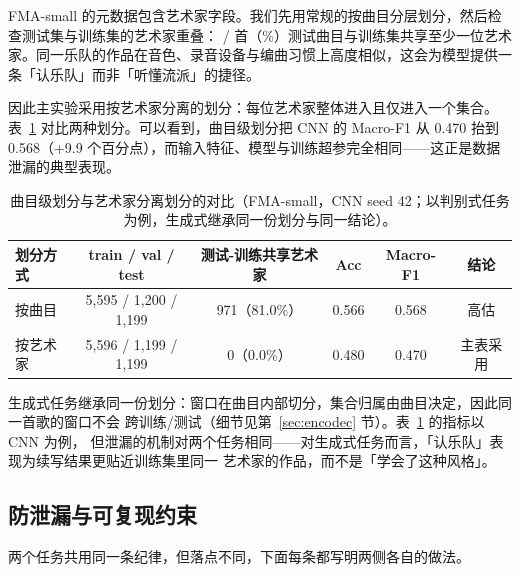 \documentclass[UTF8,10pt,a4paper]{ctexart}
\begin{document}
FMA-small 的元数据包含艺术家字段。我们先用常规的按曲目分层划分，然后检查测试集与训练集的艺术家重叠：\FmaTrackLeak{} / \FmaTrackLeakN{} 首（\FmaTrackLeakPct\%）测试曲目与训练集共享至少一位艺术家。同一乐队的作品在音色、录音设备与编曲习惯上高度相似，这会为模型提供一条「认乐队」而非「听懂流派」的捷径。

因此主实验采用按艺术家分离的划分：每位艺术家整体进入且仅进入一个集合。表~\ref{tab:leak} 对比两种划分。可以看到，曲目级划分把 CNN 的 Macro-F1 从 0.470 抬到 0.568（+9.9 个百分点），而输入特征、模型与训练超参完全相同——这正是数据泄漏的典型表现。

\begin{table}[H]
\centering\small
\caption{曲目级划分与艺术家分离划分的对比（FMA-small，CNN seed 42；以判别式任务为例，生成式继承同一份划分与同一结论）。}
\label{tab:leak}
\begin{tabular}{lccccc}
\toprule
划分方式 & train / val / test & 测试-训练共享艺术家 & Acc & Macro-F1 & 结论\\
\midrule
按曲目 & 5,595 / 1,200 / 1,199 & 971（81.0\%） & 0.566 & 0.568 & 高估\\
按艺术家 & 5,596 / 1,199 / 1,199 & 0（0.0\%） & 0.480 & 0.470 & 主表采用\\
\bottomrule
\end{tabular}
\end{table}

生成式任务继承同一份划分：窗口在曲目内部切分，集合归属由曲目决定，因此同一首歌的窗口不会
跨训练/测试（细节见第~\ref{sec:encodec} 节）。表~\ref{tab:leak} 的指标以 CNN 为例，
但泄漏的机制对两个任务相同——对生成式任务而言，「认乐队」表现为续写结果更贴近训练集里同一
艺术家的作品，而不是「学会了这种风格」。

\subsection{防泄漏与可复现约束}\label{sec:guard}
两个任务共用同一条纪律，但落点不同，下面每条都写明两侧各自的做法。
\end{document}
